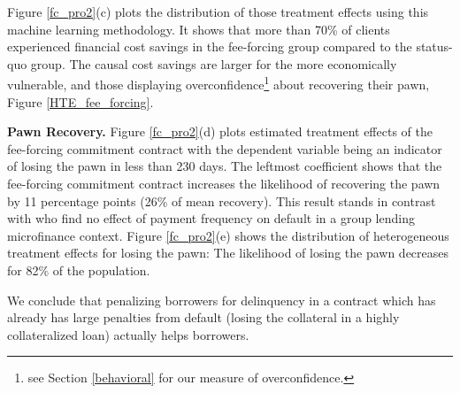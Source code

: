 \documentclass[oneside,11pt]{article}
\begin{document}
Figure \ref{fc_pro2}(c) plots the distribution of those treatment effects using this machine learning methodology. It shows that more than 70\% of clients experienced financial cost savings in the fee-forcing group compared to the status-quo group. The causal cost savings are larger for the more economically vulnerable, %
and those displaying overconfidence\footnote{see Section \ref{behavioral} for our measure of overconfidence.} about recovering their pawn, Figure \ref{HTE_fee_forcing}.

\vspace{.2in}
\noindent \textbf{Pawn Recovery.} Figure \ref{fc_pro2}(d) plots estimated treatment effects of the fee-forcing commitment contract with the dependent variable being an indicator of losing the pawn in less than 230 days. The leftmost coefficient shows that the fee-forcing commitment contract increases the likelihood of recovering the pawn by 11 percentage points (26\% of mean recovery). This result stands in contrast with \cite{Pande} who find no effect of payment frequency on default in a group lending microfinance context. Figure \ref{fc_pro2}(e) shows the distribution of heterogeneous treatment effects for losing the pawn: The likelihood of losing the pawn decreases for 82\% of the population. %


\vspace{.2in}
\noindent We conclude that penalizing borrowers for delinquency in a contract which has already has large penalties from default (losing the collateral in a highly collateralized loan) actually helps borrowers.
\end{document}
